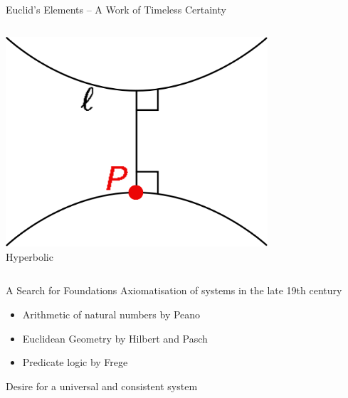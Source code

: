 \documentclass{beamer}
\begin{document}
\begin{frame}{Euclid's Elements -- A Work of Timeless Certainty}
{\begin{alertbox}
\begin{columns}[T,onlytextwidth]
	 \begin{column}{.33\textwidth}
		\centering\includegraphics[width=0.73\textwidth]{img/geo_hyp.png}\\Hyperbolic
	 \end{column}
	\end{columns}
	\end{alertbox}
	}
\end{frame}
\begin{frame}{A Search for Foundations}
Axiomatisation of systems in the late 19th century
	\pause
	\begin{itemize}[<+->]
		\item Arithmetic of natural numbers by Peano
		\item Euclidean Geometry by Hilbert and Pasch
		\item Predicate logic by Frege
	\end{itemize}
	\pause[\thebeamerpauses]
	\centering \alert{Desire for a universal and consistent system}
\end{frame}
\end{document}
